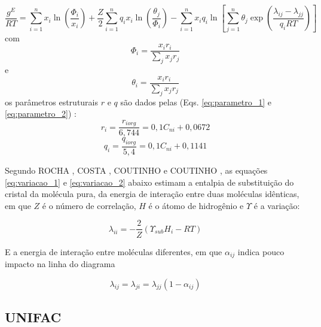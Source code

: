 	\begin{equation}\label{eq:uniquac_1}
	\frac{g^{E}}{RT}=\sum_{i=1}^{n}x_{i} \ln\left(\frac{\Phi_{i}}{x_{i}}\right) + \frac{Z}{2}\sum_{i=1}^{n}q_{i} x_{i}\ln\left(\frac{\theta_{j}}{ \Phi_{i}}\right)-\sum_{i=1}^{n}x_{i} q_{i}\ln\left[\sum_{j=1}^{n}\theta_{j }\exp\left(\frac{\lambda_{ij}-\lambda_{jj}}{q_{i}RT}\right)\right]
	\end{equation}
	com
	\begin{equation}\label{eq:uniquac_2}
	\Phi_{i}=\frac{x_{i}r_{i}}{\displaystyle\sum_{j}x_{j}r_{j}}
	\end{equation}
	e
	\begin{equation}\label{eq:uniquac_3}
	\theta_{i}=\frac{x_{i}r_{i}}{\displaystyle\sum_{j}x_{j}r_{j}}
	\end{equation}
	os parâmetros estruturais $r$ e $q$ são dados pelas (Eqs. \ref{eq:parametro_1} e \ref{eq:parametro_2}) \cite{Coutinho2005,Coutinho2006}:
	\begin{equation}\label{eq:parametro_1}
	r_{i}=\frac{r_{iorg}}{6,744}=0,1C_{ni}+0,0672	
	\end{equation}
	\begin{equation}\label{eq:parametro_2}
	q_{i}=\frac{q_{iorg}}{5,4}=0,1C_{ni}+0,1141
	\end{equation}
	
Segundo ROCHA \citeyear{Rocha2011}, COSTA  \citeyear{Costa2007}, COUTINHO \citeyear{Coutinho2005} e COUTINHO \citeyear{Coutinho2006}, as equações \ref{eq:variacao_1} e \ref{eq:variacao_2} abaixo estimam a entalpia de substituição do cristal da molécula pura, da energia de interação entre duas moléculas idênticas, em que $Z$ é o número de correlação, $H$ é o átomo de hidrogênio e $\Upsilon$ é a variação:
	
	\begin{equation}\label{eq:variacao_1}
	\lambda_{ii}=-\frac{2}{Z}\left(\Upsilon_{sub}H_{i}-RT\right)
	\end{equation}
	
	E a energia de interação entre moléculas diferentes, em que $\alpha_{ij}$ indica pouco impacto na linha do diagrama
	
	\begin{equation}\label{eq:variacao_2}
	\lambda_{ij}=\lambda_{ji}=\lambda_{jj}(1-\alpha_{ij})
	\end{equation}
	
	\subsection{UNIFAC}
	
